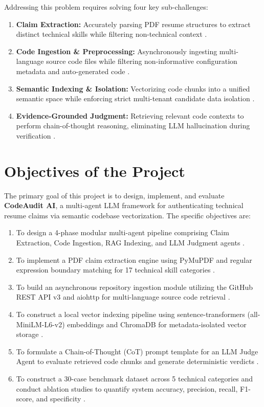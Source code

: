 Addressing this problem requires solving four key sub-challenges:
\begin{enumerate}[leftmargin=*, label=\arabic*.]
    \item \textbf{Claim Extraction:} Accurately parsing PDF resume structures to extract distinct technical skills while filtering non-technical context \cite{ref9, ref40}.
    \item \textbf{Code Ingestion \& Preprocessing:} Asynchronously ingesting multi-language source code files while filtering non-informative configuration metadata and auto-generated code \cite{ref12, ref35}.
    \item \textbf{Semantic Indexing \& Isolation:} Vectorizing code chunks into a unified semantic space while enforcing strict multi-tenant candidate data isolation \cite{ref31, ref33, ref41}.
    \item \textbf{Evidence-Grounded Judgment:} Retrieving relevant code contexts to perform chain-of-thought reasoning, eliminating LLM hallucination during verification \cite{ref10, ref11, ref25, ref42}.
\end{enumerate}

\section{Objectives of the Project}

The primary goal of this project is to design, implement, and evaluate \textbf{CodeAudit AI}, a multi-agent LLM framework for authenticating technical resume claims via semantic codebase vectorization. The specific objectives are:

\begin{enumerate}[leftmargin=*, label=\arabic*.]
    \item To design a 4-phase modular multi-agent pipeline comprising Claim Extraction, Code Ingestion, RAG Indexing, and LLM Judgment agents \cite{ref10, ref7, ref37, ref38, ref43}.
    \item To implement a PDF claim extraction engine using PyMuPDF and regular expression boundary matching for 17 technical skill categories \cite{ref40}.
    \item To build an asynchronous repository ingestion module utilizing the GitHub REST API v3 and aiohttp for multi-language source code retrieval \cite{ref12, ref35}.
    \item To construct a local vector indexing pipeline using sentence-transformers (all-MiniLM-L6-v2) embeddings and ChromaDB for metadata-isolated vector storage \cite{ref31, ref33, ref41}.
    \item To formulate a Chain-of-Thought (CoT) prompt template for an LLM Judge Agent to evaluate retrieved code chunks and generate deterministic verdicts \cite{ref10, ref11, ref25, ref42}.
    \item To construct a 30-case benchmark dataset across 5 technical categories and conduct ablation studies to quantify system accuracy, precision, recall, F1-score, and specificity \cite{ref20, ref8, ref23}.
\end{enumerate}

